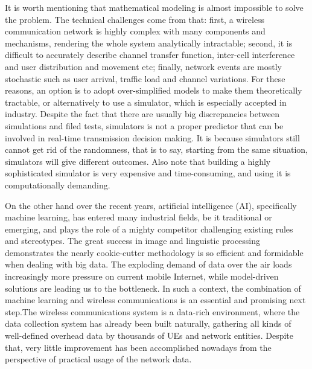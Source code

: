 \documentclass[journal]{IEEEtran}
\begin{document}
	It is worth mentioning that mathematical modeling is almost impossible to solve the problem. The technical challenges come from that: first, a wireless communication network is highly complex with many components and mechanisms, rendering the whole system analytically intractable; second, it is difficult to accurately describe channel transfer function, inter-cell interference and user distribution and movement etc; finally, network events are mostly stochastic such as user arrival, traffic load and channel variations. For these reasons, an option is to adopt over-simplified models to make them theoretically tractable, or alternatively to use a simulator, which is especially accepted in industry. Despite the fact that there are usually big discrepancies between simulations and filed tests, simulators is not a proper predictor that can be involved in real-time transmission decision making. It is because simulators still cannot get rid of the randomness, that is to say, starting from the same situation, simulators will give different outcomes. Also note that building a highly sophisticated simulator is very expensive and time-consuming, and using it is computationally demanding.
	
	On the other hand over the recent years, artificial intelligence (AI), specifically machine learning, has entered many industrial fields, be it traditional or emerging, and plays the role of a mighty competitor challenging existing rules and stereotypes. The great success in image and linguistic processing demonstrates the nearly cookie-cutter methodology is so efficient and formidable when dealing with big data. The exploding demand of data over the air loads increasingly more pressure on current mobile Internet, while model-driven solutions are leading us to the bottleneck. In such a context, the combination of machine learning and wireless communications is an essential and promising next step.The wireless communications system is a data-rich environment, where the data collection system has already been built naturally, gathering all kinds of well-defined overhead data by thousands of UEs and network entities. Despite that, very little improvement has been accomplished nowadays from the perspective of practical usage of the network data. 
	
\end{document}
